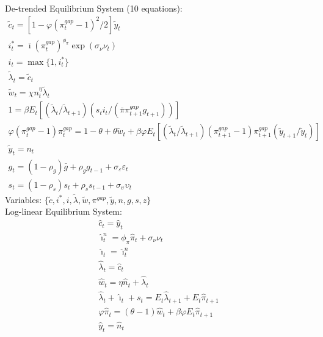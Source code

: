 \documentclass[12pt, final]{article}
\begin{document}
\setcounter{equation}{0}
\noindent De-trended Equilibrium System (10 equations):
\small\begin{gather}
\tilde{c}_t = [1-\varphi(\pi_t^{gap} - 1)^2/2]\tilde{y}_t\\
i_t^*=\bar{\imath}(\pi_t^{gap})^{\phi_\pi}\exp(\sigma_\nu\nu_t)\\
i_t=\max\{1,i_t^*\}\\
\tilde{\lambda}_t = \tilde{c}_t\\
\tilde{w}_t = \chi n_t^\eta \tilde{\lambda}_t  \\
  1 = \beta E_t[(\tilde{\lambda}_t/\tilde{\lambda}_{t+1})(s_ti_t/(\bar{\pi}\pi_{t+1}^{gap}g_{t+1}))]\\
  \varphi(\pi_t^{gap}-1){\pi}_t^{gap} = 1-\theta + \theta\tilde{w}_t + \beta\varphi E_t[(\tilde{\lambda}_t/\tilde{\lambda}_{t+1}) (\pi_{t+1}^{gap}-1)\pi_{t+1}^{gap}(\tilde{y}_{t+1}/\tilde{y}_t)]\\
  \tilde{y}_t= n_t\\  
  g_t= (1-\rho_g)\bar{g}+\rho_gg_{t-1} + \sigma_\varepsilon\varepsilon_t \\
  s_t=(1-\rho_s)s_t+\rho_ss_{t-1} + \sigma_\upsilon\upsilon_t
\end{gather}
Variables: $\{\tilde{c},i^*,i,\tilde{\lambda},\tilde{w},\pi^{gap},\tilde{y},n,g,s,z\}$\\ 

\setcounter{equation}{0}
\noindent Log-linear Equilibrium System:
\begin{gather}
  \hat{c}_t = \hat{y}_t\\
  \hat{\imath}_t^n = \phi_\pi\hat{\pi}_t+\sigma_\nu\nu_t \\
  \hat{\imath}_t = \hat{\imath}_t^n\\
  \hat{\lambda}_t = \hat{c}_t \\
  \hat{w}_t =  \eta\hat{n}_t + \hat{\lambda}_t\\
  \hat{\lambda}_t + \hat{\imath}_t + s_t  = E_t\hat{\lambda}_{t+1}+E_t\hat{\pi}_{t+1} \\
  \varphi\hat{\pi}_t = (\theta-1)\hat{w}_t+\beta\varphi E_t\hat{\pi}_{t+1}\\
  \hat{y}_t = \hat{n}_t 
\end{gather}
\pagebreak
\setcounter{equation}{0}
\end{document}
